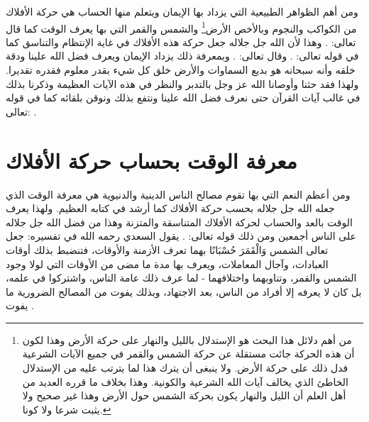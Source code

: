 
ومن أهم الظواهر الطبيعية التي يزداد بها الإيمان ويتعلم منها الحساب هي حركة الأفلاك من الكواكب والنجوم وبالأخص الأرض\footnote{من أهم دلائل هذا البحث هو الإستدلال بالليل والنهار على حركة الأرض وهذا لكون أن هذه الحركة جائت مستقلة عن حركة الشمس والقمر في جميع الآيات الشرعية فدل ذلك على حركة الأرض. ولا ينبغى أن يترك هذا لما يترتب عليه من الإستدلال الخاطئ الذي يخالف آيات الله الشرعية والكونية. وهذا بخلاف ما قرره العديد من أهل العلم أن الليل والنهار يكون بحركة الشمس حول الأرض وهذا غير صحيح ولا يثبت شرعا ولا كونا.} والشمس والقمر التي بها يعرف الوقت كما قال تعالى: \quranayah*[16][12]{\footnotesize \surahname*[16]}. وهذا لأن الله جل جلاله جعل حركة هذه الأفلاك في غاية الإنتظام والتناسق كما في قوله تعالى: \quranayah*[21][33]{\footnotesize \surahname*[21]}. وقال تعالى: \quranayah*[36][40]{\footnotesize \surahname*[36]}. وبمعرفة ذلك يزداد الإيمان ويعرف فضل الله علينا ودقة خلقه وأنه سبحانه هو بديع السماوات والأرض خلق كل شيء بقدر معلوم فقدره تقديرا. ولهذا فقد حثنا وأوصانا الله عز وجل بالتدبر والنظر في هذه الآيات العظيمة وذكرنا بذلك في غالب آيات القرآن حتى نعرف فضل الله علينا ونتفع بذلك ونوقن بلقائه كما في قوله تعالى: \quranayah*[13][2]{\footnotesize \surahname*[13]}.

\section{معرفة الوقت بحساب حركة الأفلاك}

ومن أعظم النعم التي بها تقوم مصالح الناس الدينية والدنيوية هي معرفة الوقت الذي جعله الله جل جلاله بحسب حركة الأفلاك كما أرشد في كتابه العظيم. ولهذا يعرف الوقت بالعد والحساب لحركة الأفلاك المتناسقة والمتزنة وهذا من فضل الله جل جلاله على الناس أجمعين ومن ذلك قوله تعالى: 
\quranayah*[6][96]{\footnotesize \surahname*[6]}. يقول السعدي رحمه الله في تفسيره:  جعل تعالى الشمس وَالْقَمَرَ حُسْبَانًا بهما تعرف الأزمنة والأوقات، فتنضبط بذلك أوقات العبادات، وآجال المعاملات، ويعرف بها مدة ما مضى من الأوقات التي لولا وجود الشمس والقمر، وتناوبهما واختلافهما - لما عرف ذلك عامة الناس، واشتركوا في علمه، بل كان لا يعرفه إلا أفراد من الناس، بعد الاجتهاد، وبذلك يفوت من المصالح الضرورية ما يفوت \cite{tafsir_Saadi}.

